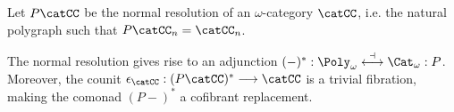 \documentclass{article}
\begin{document}
Let $P \catCC$ be the normal resolution of an $\omega$-category $\catCC$, i.e. the natural polygraph such that $P \catCC_n = \catCC_n$.

\begin{proposition}
The normal resolution gives rise to an adjunction $(-)^* : \Poly_\omega \stackrel{\dashv}{\longleftrightarrow} \Cat_\omega : P$. Moreover, the counit $\epsilon_\catCC : (P \catCC)^* \longrightarrow \catCC$ is a trivial fibration, making the comonad $(P -)^*$ a cofibrant replacement.
\end{proposition}

\nocite{*}


\end{document}
